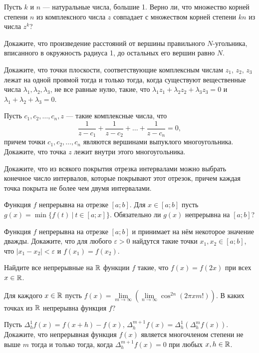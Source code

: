 \documentclass[a4paper,12pt]{article}
\begin{document}

Пусть $k$ и $n$ --- натуральные числа, большие 1.
Верно ли, что множество корней степени $n$ из комплексного числа $z$
совпадает с множеством корней степени $kn$ из числа $z^k$?


Докажите, что произведение расстояний от вершины правильного $N$-угольника, вписанного в окружность радиуса 1, до остальных его вершин равно $N$.

Докажите, что точки плоскости, соответствующие комплексным числам
$z_1$, $z_2$, $z_3$ лежат на одной проямой тогда и только тогда,
когда существуют вещественные числа $\lambda_1,\lambda_2,\lambda_3$,
не все равные нулю, такие, что $\lambda_1z_1+\lambda_2z_2+\lambda_3z_3=0$
и $\lambda_1+\lambda_2+\lambda_3=0$.

Пусть $c_1,c_2,\dots,c_n,z$ --- такие комплексные числа, что
$$
\frac1{z-c_1}+\frac1{z-c_2}+\dots+\frac1{z-c_n}=0,
$$
причем точки $c_1,c_2,\dots,c_n$ являются вершинами выпуклого
многоугольника. Докажите, что точка $z$ лежит внутри
этого многоугольника.


Докажите, что из всякого покрытия отрезка интервалами можно выбрать конечное
число интервалов, которые покрывают этот отрезок, причем каждая точка
покрыта не более чем двумя интервалами.


Функция $f$ непрерывна на отрезке $[a;b]$.
Для $x\in[a;b]$ пусть $g(x)=\min\{f(t)\ |\ t\in[a;x]\}.$
Обязательно ли $g(x)$ непрерывна на $[a;b]$?

Функция $f$ непрерывна на отрезке $[a;b]$  и принимает на нём некоторое значение
дважды. Докажите, что для любого $\varepsilon>0$
найдутся такие точки $x_1,x_2\in[a;b]$, что $|x_1-x_2|<\varepsilon$
и $f(x_1)=f(x_2)$.

Найдите все непрерывные на $\mathbb{R}$ функции $f$ такие, что $f(x)=f(2x)$
при всех $x\in\mathbb{R}$.

Для каждого $x\in\mathbb{R}$ пусть
$f(x)=\lim\limits_{m\rightarrow\infty}\left(\lim\limits_{n\rightarrow\infty}
\cos^{2n}(2\pi x m!)\right)$. В каких точках из $\mathbb{R}$ непрерывна функция $f$?

Пусть $\Delta^1_hf(x)=f(x+h)-f(x)$,
$\Delta^{m+1}_hf(x)=\Delta^1_h\left(\Delta^{m}_hf(x)\right)$.
Докажите, что непрерывная функция $f(x)$ является многочленом степени
не выше $m$ тогда и только тогда, когда
$\Delta^{m+1}_hf(x)=0$ при любых $x,h\in\mathbb{R}$.
\end{document}
